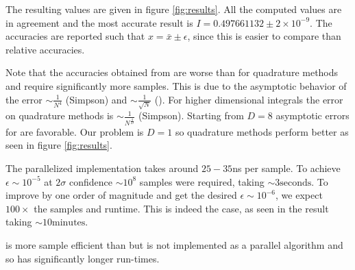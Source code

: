 \documentclass[10pt, a4paper]{article}
\newcommand{\finalval}{0.497661132 \pm 2\times10^{-9}}
\newcommand{\final}{$I = \finalval$}
\begin{document}
  The resulting values are given in figure \ref{fig:results}. All the computed values
  are in agreement and the most accurate result is \final. The accuracies are reported such that
  $x = \bar x \pm \epsilon$, since this is easier to compare than relative accuracies.

  Note that the accuracies obtained from \is{} are worse than for quadrature methods and require
  significantly more samples. This is due to the asymptotic behavior of the error $\sim \frac{1}{N^4}$
  (Simpson) and $\sim \frac{1}{\sqrt{N}}$ (\is). For higher dimensional integrals the error on quadrature
  methods is $\sim \frac{1}{N^{\frac4D}}$ (Simpson). Starting from $D=8$ asymptotic errors for \is{}
  are favorable. Our problem is $D=1$ so quadrature methods perform better as seen in figure \ref{fig:results}.

  The parallelized \is{} implementation takes around $25-35$ns per sample. To achieve $\epsilon \sim 10^{-5}$
  at $2\sigma$ confidence $\sim 10^{8}$ samples were required, taking $\sim 3\text{seconds}$. To improve
  by one order of magnitude and get the desired $\epsilon \sim 10^{-6}$, we expect $100\times$ the
  samples and runtime. This is indeed the case, as seen in the \is{} result taking
  $\sim 10\text{minutes}$\footnotemark.


  \apis{} is more sample efficient than \is{} but is not implemented as a parallel algorithm and
  so has significantly longer run-times.
\end{document}
